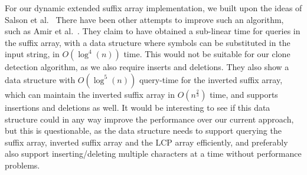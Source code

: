 For our dynamic extended suffix array implementation, we built upon the ideas of Salson et
al.~\cite{DynamicExtendedSuffixArrays, DynamicExtendedSuffixArraysReorderings, DynamicBWT}
There have been other attempts to improve such an algorithm, such as Amir et
al.~\cite{AmirDynamicSuffixWithPoly}. They claim to have obtained a sub-linear time for
queries in the suffix array, with a data structure where symbols can be substituted in the
input string, in $O(\log^4(n))$ time. This would not be suitable for our clone detection
algorithm, as we also require inserts and deletions. They also show a data structure with
$O(\log^5(n))$ query-time for the inverted suffix array, which can maintain the inverted
suffix array in $O(n^{\frac{2}{3}})$ time, and supports insertions and deletions as well.
It would be interesting to see if this data structure could in any way improve the
performance over our current approach, but this is questionable, as the data structure
needs to support querying the suffix array, inverted suffix array and the LCP array
efficiently, and preferably also support inserting/deleting multiple characters at a time
without performance problems.
